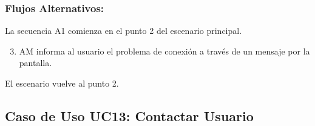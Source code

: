 \begin{framed}
\subsubsection{Flujos Alternativos: }

La secuencia A1 comienza en el punto 2 del escenario principal.
\begin{enumerate}
    \setcounter{enumi}{2}
    \item AM informa al usuario el problema de conexión a través de un mensaje por la pantalla.
\end{enumerate}
El escenario vuelve al punto 2.

\end{framed}


\subsection{Caso de Uso UC13: Contactar Usuario}

